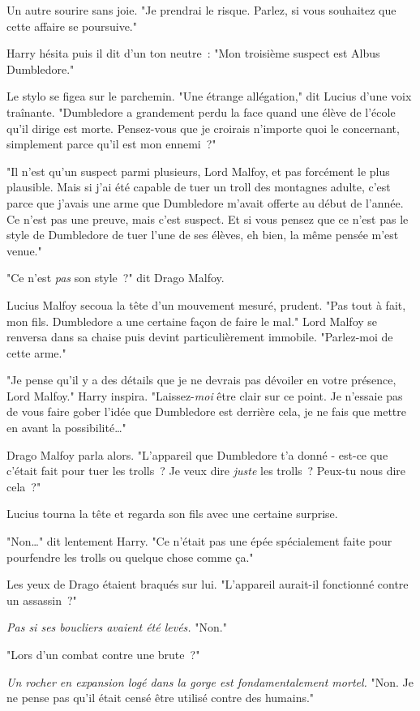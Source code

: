 Un autre sourire sans joie. "Je prendrai le risque. Parlez, si vous souhaitez que cette affaire se poursuive."

Harry hésita puis il dit d'un ton neutre~: "Mon troisième suspect est Albus Dumbledore."

Le stylo se figea sur le parchemin. "Une étrange allégation," dit Lucius d'une voix traînante. "Dumbledore a grandement perdu la face quand une élève de l'école qu'il dirige est morte. Pensez-vous que je croirais n'importe quoi le concernant, simplement parce qu'il est mon ennemi~?"

"Il n'est qu'un suspect parmi plusieurs, Lord Malfoy, et pas forcément le plus plausible. Mais si j'ai été capable de tuer un troll des montagnes adulte, c'est parce que j'avais une arme que Dumbledore m'avait offerte au début de l'année. Ce n'est pas une preuve, mais c'est suspect. Et si vous pensez que ce n'est pas le style de Dumbledore de tuer l'une de ses élèves, eh bien, la même pensée m'est venue."

"Ce n'est \emph{pas} son style~?" dit Drago Malfoy.

Lucius Malfoy secoua la tête d'un mouvement mesuré, prudent. "Pas tout à fait, mon fils. Dumbledore a une certaine façon de faire le mal." Lord Malfoy se renversa dans sa chaise puis devint particulièrement immobile. "Parlez-moi de cette arme."

"Je pense qu'il y a des détails que je ne devrais pas dévoiler en votre présence, Lord Malfoy." Harry inspira. "Laissez-\emph{moi} être clair sur ce point. Je n'essaie pas de vous faire gober l'idée que Dumbledore est derrière cela, je ne fais que mettre en avant la possibilité…"

Drago Malfoy parla alors. "L'appareil que Dumbledore t'a donné - est-ce que c'était fait pour tuer les trolls~? Je veux dire \emph{juste} les trolls~? Peux-tu nous dire cela~?"

Lucius tourna la tête et regarda son fils avec une certaine surprise.

"Non…" dit lentement Harry. "Ce n'était pas une épée spécialement faite pour pourfendre les trolls ou quelque chose comme ça."

Les yeux de Drago étaient braqués sur lui. "L'appareil aurait-il fonctionné contre un assassin~?"

\emph{Pas si ses boucliers avaient été levés.} "Non."

"Lors d'un combat contre une brute~?"

\emph{Un rocher en expansion logé dans la gorge est fondamentalement mortel.} "Non. Je ne pense pas qu'il était censé être utilisé contre des humains."


